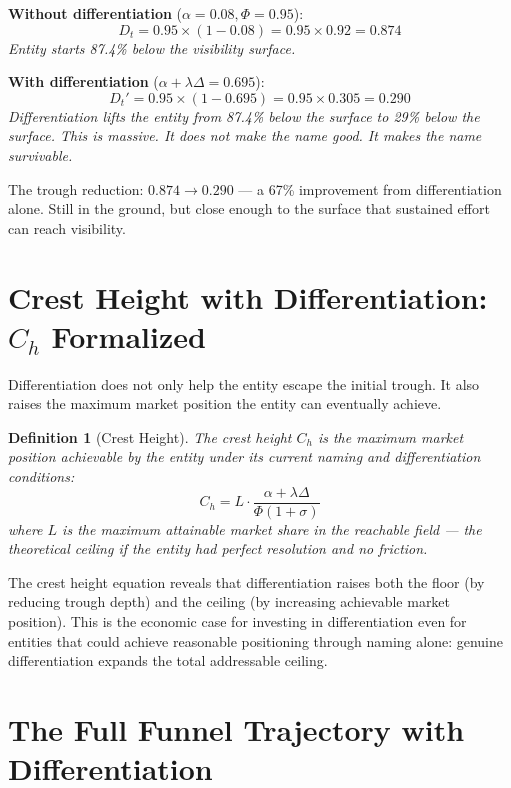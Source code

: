 \documentclass[12pt, openany]{book}
\theoremstyle{thmstyle}
\theoremstyle{defstyle}
\newtheorem{definition}{Definition}[chapter]
\begin{document}
\begin{calcbox}
\textbf{Without differentiation} ($\alpha = 0.08, \Phi = 0.95$):
\[
D_t = 0.95 \times (1 - 0.08) = 0.95 \times 0.92 = 0.874
\]
\textit{Entity starts 87.4\% below the visibility surface.}

\vspace{8pt}
\textbf{With differentiation} ($\alpha + \lambda\Delta = 0.695$):
\[
D_t' = 0.95 \times (1 - 0.695) = 0.95 \times 0.305 = 0.290
\]
\textit{Differentiation lifts the entity from 87.4\% below the surface to 29\% below the surface. This is massive. It does not make the name good. It makes the name survivable.}

\vspace{8pt}
The trough reduction: $\mathbf{0.874 \to 0.290}$ --- a 67\% improvement from differentiation alone. Still in the ground, but close enough to the surface that sustained effort can reach visibility.
\end{calcbox}

\section{Crest Height with Differentiation: $C_h$ Formalized}

Differentiation does not only help the entity escape the initial trough. It also raises the maximum market position the entity can eventually achieve.

\begin{definition}[Crest Height]
The crest height $C_h$ is the maximum market position achievable by the entity under its current naming and differentiation conditions:
\begin{equation}
C_h = L \cdot \frac{\alpha + \lambda\Delta}{\Phi(1+\sigma)}
\label{eq:crest}
\end{equation}
where $L$ is the maximum attainable market share in the reachable field --- the theoretical ceiling if the entity had perfect resolution and no friction.
\end{definition}

The crest height equation reveals that differentiation raises both the floor (by reducing trough depth) and the ceiling (by increasing achievable market position). This is the economic case for investing in differentiation even for entities that could achieve reasonable positioning through naming alone: genuine differentiation expands the total addressable ceiling.

\section{The Full Funnel Trajectory with Differentiation}
\end{document}
